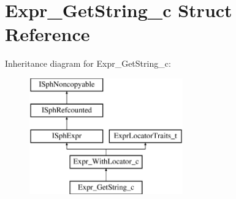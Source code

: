 \hypertarget{structExpr__GetString__c}{\section{Expr\-\_\-\-Get\-String\-\_\-c Struct Reference}
\label{structExpr__GetString__c}
}
Inheritance diagram for Expr\-\_\-\-Get\-String\-\_\-c\-:\begin{figure}[H]
\begin{center}
\leavevmode
\includegraphics[height=5.000000cm]{structExpr__GetString__c}
\end{center}
\end{figure}
